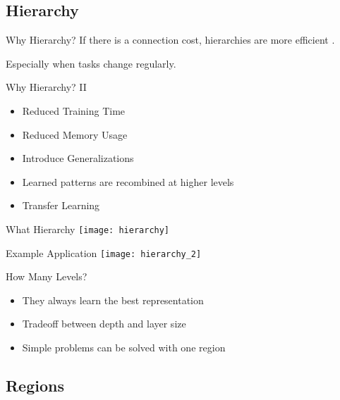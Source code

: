 
\subsection{Hierarchy}


\begin{frame}[c]{Why Hierarchy?}
    \Large
    \pause
    If there is a connection cost, hierarchies are more efficient \cite{mengistu2016evolutionary}.

    \pause
    Especially when tasks change regularly.
\end{frame}


\begin{frame}[c]{Why Hierarchy? II}
    \Large
    \begin{itemize}[<+(1)->]
        \item Reduced Training Time
        \item Reduced Memory Usage
        \item Introduce Generalizations
        \item Learned patterns are recombined at higher levels
        \item Transfer Learning
    \end{itemize}
\end{frame}


\begin{frame}[c]{What Hierarchy}
    \pause
    \texttt{[image: hierarchy]}
\end{frame}


\begin{frame}[c]{Example Application}
    \texttt{[image: hierarchy\_2]}
\end{frame}


\begin{frame}[c]{How Many Levels?}
    \Large
    \begin{itemize}[<+(1)->]
        \item They always learn the best representation
        \item Tradeoff between depth and layer size
        \item Simple problems can be solved with one region
    \end{itemize}
\end{frame}



\subsection{Regions}


